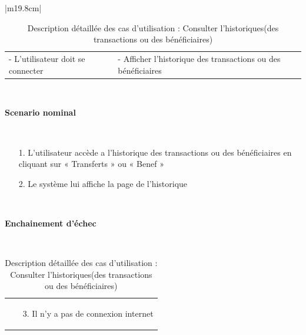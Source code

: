 \begin{table}[h]
\begin{tabular}{|m{19.8cm}|}
		\hline
		\begin{tabular}{m{9.3cm}|m{9.3cm}}
			- L’utilisateur doit se connecter \newline
			 & 
			- Afficher  l'historique des transactions ou des  \newline bénéficiaires
			\\[0ex]
		\end{tabular}
		\\
		\hline
		\begin{center}
			\textbf{Scenario nominal}
		\end{center}
		\\
		[-4ex]
		\hline
		\begin{enumerate}
			\item [1.] L’utilisateur accède a l'historique des transactions ou des bénéficiaires en cliquant sur « Transferts » ou « Benef »
			\item [2.] Le système lui affiche la page de l'historique
		\end{enumerate}
		\\
		[-4ex]
		\hline	
		\begin{center}
			\textbf{Enchainement d’échec }
		\end{center}
		\\ 
		[-4ex]
		\hline
		\begin{tabular}{m{17.5cm}}
			\begin{enumerate}
				\item [3.] Il n’y a pas de connexion internet
				
			\end{enumerate}
			\\[-4ex]
		\end{tabular}
		\\
		\hline	
		
	\end{tabular}
	\vspace*{2cm}
	\centering \caption{Description détaillée des cas d'utilisation : Consulter l'historiques(des transactions ou des bénéficiaires)}
	\label{4.1}
\end{table}

\newpage

